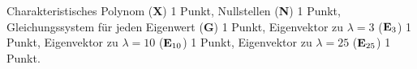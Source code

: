 \begin{bewertung}
Charakteristisches Polynom ({\bf X}) 1 Punkt,
Nullstellen ({\bf N}) 1 Punkt,
Gleichungssystem für jeden Eigenwert ({\bf G}) 1 Punkt,
Eigenvektor zu $\lambda = 3$ ($\text{\bf E}_3$) 1 Punkt,
Eigenvektor zu $\lambda = 10$ ($\text{\bf E}_{10}$) 1 Punkt,
Eigenvektor zu $\lambda = 25$ ($\text{\bf E}_{25}$) 1 Punkt.
\end{bewertung}
